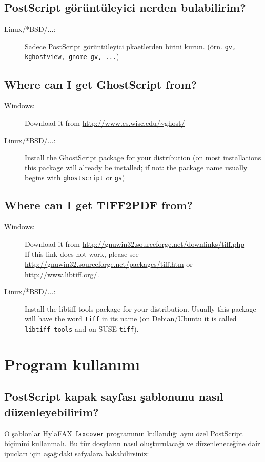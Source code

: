 \documentclass[a4paper,10pt]{scrartcl}
\begin{document}
\subsection{PostScript görüntüleyici nerden bulabilirim?}
\begin{description}
\item[Linux/*BSD/...:] Sadece PostScript görüntüleyici pkaetlerden birini kurun.
		(örn. \texttt{gv, kghostview, gnome-gv, ...})


\end{description}

\subsection{Where can I get GhostScript from?}
\begin{description}
\item[Windows:] Download it from \url{http://www.cs.wisc.edu/~ghost/}
\item[Linux/*BSD/...:] Install the GhostScript package for your distribution (on most installations this package will already be installed; if not: the package name usually begins with \texttt{ghostscript} or \texttt{gs})
\end{description}

\subsection{Where can I get TIFF2PDF from?}
\begin{description}
\item[Windows:] Download it from \url{http://gnuwin32.sourceforge.net/downlinks/tiff.php}\\ If this link does not work, please see \url{http://gnuwin32.sourceforge.net/packages/tiff.htm} or \url{http://www.libtiff.org/}.
\item[Linux/*BSD/...:] Install the libtiff tools package for your distribution. Usually this package will have the word \texttt{tiff} in its name (on Debian/Ubuntu it is called \texttt{libtiff-tools} and on SUSE \texttt{tiff}).
\end{description}

\section{Program kullanımı}

\subsection{PostScript kapak sayfası şablonunu nasıl düzenleyebilirim?}
O şablonlar HylaFAX \texttt{faxcover} programının kullandığı aynı özel PostScript biçimini kullanmalı.
Bu tür dosyların nasıl oluşturulacağı ve düzenleneceğine dair ipucları için aşağıdaki safyalara bakabilirsiniz:
\end{document}
